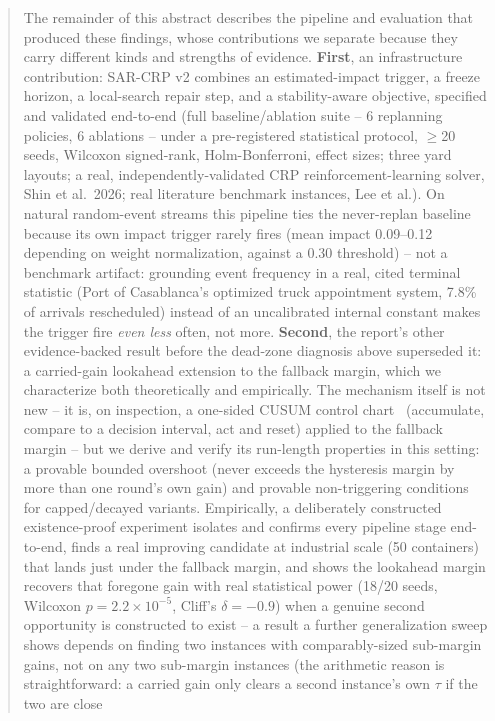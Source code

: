 \documentclass[11pt]{article}
\begin{document}
\begin{abstract}
The remainder of this abstract describes the pipeline and evaluation that
produced these findings, whose contributions we separate because they carry
different kinds and strengths of evidence.
\textbf{First}, an infrastructure contribution: SAR-CRP v2 combines an
estimated-impact trigger, a freeze horizon, a local-search repair step,
and a stability-aware objective, specified and validated end-to-end
(full baseline/ablation suite -- 6 replanning policies, 6 ablations --
under a pre-registered statistical protocol, $\geq$20 seeds, Wilcoxon
signed-rank, Holm-Bonferroni, effect sizes; three yard layouts; a real,
independently-validated CRP reinforcement-learning solver, Shin et al.\
2026; real literature benchmark instances, Lee et al.). On natural
random-event streams this pipeline ties the never-replan baseline because
its own impact trigger rarely fires (mean impact 0.09--0.12 depending on
weight normalization, against a 0.30 threshold) -- not a benchmark
artifact: grounding event frequency in a real, cited terminal statistic
(Port of Casablanca's optimized truck appointment system, 7.8\% of
arrivals rescheduled) instead of an uncalibrated internal constant makes
the trigger fire \emph{even less} often, not more. \textbf{Second}, the
report's other evidence-backed result before the dead-zone diagnosis
above superseded it: a carried-gain lookahead extension to the fallback
margin, which we characterize both theoretically and empirically. The
mechanism itself is not new -- it is, on inspection, a one-sided CUSUM
control chart~\cite{page1954} (accumulate, compare to a decision interval,
act and reset) applied to the fallback margin -- but we derive and verify
its run-length properties in this setting: a provable bounded overshoot
(never exceeds the hysteresis margin by more than one round's own gain)
and provable non-triggering conditions for capped/decayed variants.
Empirically, a deliberately
constructed existence-proof experiment isolates and confirms every
pipeline stage end-to-end, finds a real improving candidate at industrial
scale (50 containers) that lands just under the fallback margin, and
shows the lookahead margin recovers that foregone gain with real
statistical power (18/20 seeds, Wilcoxon $p=2.2\times10^{-5}$, Cliff's
$\delta=-0.9$) when a genuine second opportunity is constructed to
exist -- a result a further generalization sweep shows depends on finding
two instances with comparably-sized sub-margin gains, not on any two
sub-margin instances (the arithmetic reason is straightforward: a carried
gain only clears a second instance's own $\tau$ if the two are close

\end{abstract}
\end{document}
